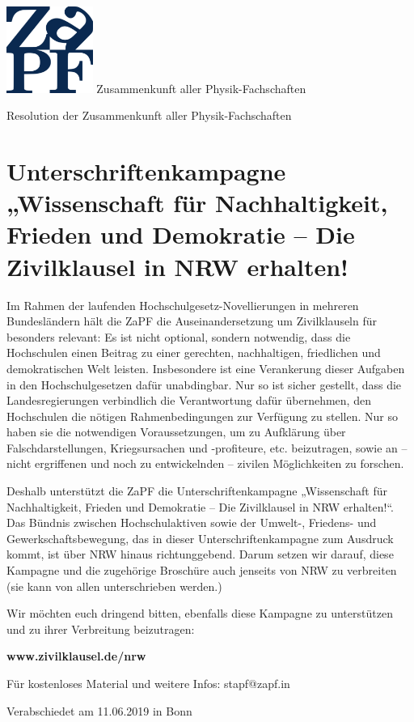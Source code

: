 \documentclass[DIV=calc]{scrartcl}
\begin{document}
    \hspace{0.87\textwidth}
    \begin{minipage}{120pt}
        \vspace{-1.8cm}
        \includegraphics[width=80pt]{logo.png}
        \centering
        \small Zusammenkunft aller Physik-Fachschaften
    \end{minipage}
    \begin{center}
        \huge{Resolution der Zusammenkunft aller Physik-Fachschaften}\vspace{.25\baselineskip}\\
        \normalsize
    \end{center}
    \vspace{1cm}

\section*{Unterschriftenkampagne „Wissenschaft für Nachhaltigkeit, Frieden und Demokratie – Die Zivilklausel in NRW erhalten!}
Im Rahmen der laufenden Hochschulgesetz-Novellierungen in mehreren Bundesländern hält die ZaPF die Auseinandersetzung um Zivilklauseln für besonders relevant: Es ist nicht optional, sondern notwendig, dass die Hochschulen einen Beitrag zu einer gerechten, nachhaltigen, friedlichen und demokratischen Welt leisten. Insbesondere ist eine Verankerung dieser Aufgaben in den Hochschulgesetzen dafür unabdingbar. Nur so ist sicher gestellt, dass die Landesregierungen verbindlich die Verantwortung dafür übernehmen, den Hochschulen die nötigen Rahmenbedingungen zur Verfügung zu stellen. Nur so haben sie die notwendigen Voraussetzungen, um zu Aufklärung über Falschdarstellungen, Kriegsursachen und -profiteure, etc. beizutragen, sowie an – nicht ergriffenen und noch zu entwickelnden – zivilen Möglichkeiten zu forschen.

Deshalb unterstützt die ZaPF die Unterschriftenkampagne „Wissenschaft für Nachhaltigkeit, Frieden und Demokratie – Die Zivilklausel in NRW erhalten!“. Das Bündnis zwischen Hochschulaktiven sowie der Umwelt-, Friedens- und Gewerkschaftsbewegung, das in dieser Unterschriftenkampagne zum Ausdruck kommt, ist über NRW hinaus richtunggebend. Darum setzen wir darauf, diese Kampagne und die zugehörige Broschüre auch jenseits von NRW zu verbreiten (sie kann von allen unterschrieben werden.)

Wir möchten euch dringend bitten, ebenfalls diese Kampagne zu unterstützen und zu ihrer Verbreitung beizutragen:

\textbf{www.zivilklausel.de/nrw}

Für kostenloses Material und weitere Infos:
stapf@zapf.in

\vfill
    \begin{flushright}
        Verabschiedet am 11.06.2019 in Bonn
    \end{flushright}
\end{document}
